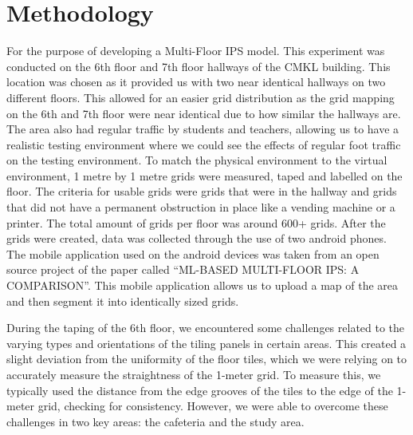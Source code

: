 \documentclass[conference]{IEEEtran}
\begin{document}
	
	\section{Methodology}
	For the purpose of developing a Multi-Floor IPS model. This experiment was conducted on the 6th floor and 7th floor hallways of the CMKL building. This location was chosen as it provided us with two near identical hallways on two different floors. This allowed for an easier grid distribution as the grid mapping on the 6th and 7th floor were near identical due to how similar the hallways are. The area also had regular traffic by students and teachers, allowing us to have a realistic testing environment where we could see the effects of regular foot traffic on the testing environment. To match the physical environment to the virtual environment, 1 metre by 1 metre grids were measured, taped and labelled on the floor. The criteria for usable grids were grids that were in the hallway and grids that did not have a permanent obstruction in place like a vending machine or a printer. The total amount of grids per floor was around 600+ grids. After the grids were created, data was collected through the use of two android phones. The mobile application used on the android devices was taken from an open source project of the paper called “ML-BASED MULTI-FLOOR IPS: A COMPARISON”\cite{bgp4}. This mobile application allows us to upload a map of the area and then segment it into identically sized grids.
	
	
	During the taping of the 6th floor, we encountered some challenges related to the varying types and orientations of the tiling panels in certain areas. This created a slight deviation from the uniformity of the floor tiles, which we were relying on to accurately measure the straightness of the 1-meter grid. To measure this, we typically used the distance from the edge grooves of the tiles to the edge of the 1-meter grid, checking for consistency. However, we were able to overcome these challenges in two key areas: the cafeteria and the study area.
	

		
\end{document}
